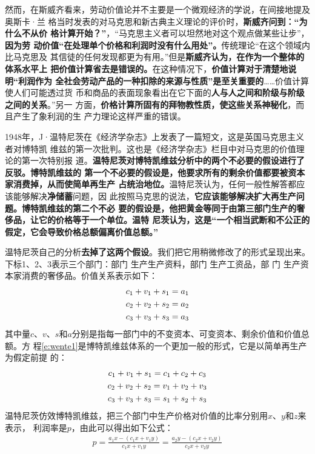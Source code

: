 然而，在斯威齐看来，劳动价值论并不主要是一个微观经济的学说，在间接地提及奥斯卡·兰
格当时发表的对马克思和新古典主义理论的评价时，\textbf{斯威齐问到：“为什么不从价
  格计算开始？”}，“马克思主义者可以坦然地对这个观点做某些让步”，\textbf{因为劳
  动价值“在处理单个价格和利润时没有什么用处”。}传统理论“在这个领域内比马克思及
其信徒的任何发现都更为有用。”但是\textbf{斯威齐认为，在作为一个整体的体系水平上
  把价值计算省去是错误的。}在这种情况下，\textbf{价值计算对于清楚地说明“利润作为
  全社会劳动产品的一种扣除的来源与性质”是至关重要的}……价值计算使人们可能透过货
币和商品的表面现象看出在它下面的\textbf{人与人之间和阶级与阶级之间的关系}。”另一
方面，\textbf{价格计算所固有的拜物教性质，使这些关系神秘化}，而且产生了象利润的生
产力理论这样严重的错误。

1948年，J·温特尼茨在《经济学杂志》上发表了一篇短文，这是英国马克思主义者对博特凯
维兹的第一次批判。这也是《经济学杂志》栏目中对马克思的价值理论的第一次特别报
道。\textbf{温特尼茨对博特凯维兹分析中的两个不必要的假设进行了反驳。博特凯维兹的
  第一个不必要的假设是，他要求所有的剩余价值都要被资本家消费掉，从而使简单再生产
  占统治地位。}温特尼茨认为，任何一般性解答都应该能够解决\textbf{净储蓄}问题，因
此按照马克思的说法，\textbf{它应该能够解决扩大再生产问题。博特凯维兹的第二个不必
  要的假设是，他把黄金等同于由第三部门生产的奢侈品，让它的价格等于一个单位。温特
  尼茨认为，这是“一个相当武断和不公正的假定，它会导致价格总额偏离价值总额。”}

温特尼茨自己的分析\textbf{去掉了这两个假设}。我们把它用稍微修改了的形式呈现出来。
下标1、2、3表示三个部门：部门 生产生产资料，部门 生产工资品，部
门 生产资本家消费的奢侈品。价值关系表示如下：
\begin{gather}
  c_1+v_1+s_1=a_1  \label{e:wente1}\\
  c_2+v_2+s_2=a_2 \notag  \\
  c_3+v_3+s_3=a_3  \notag
\end{gather}
其中量$c、v、s和a$分别是指每一部门中的不变资本、可变资本、剩余价值和价值总额。方
程\eqref{e:wente1}是博特凯维兹体系的一个更加一般的形式，它是以简单再生产为假定前提
的：
\begin{gather}
  c_1+v_1+s_1=c_1+c_2+c_3  \label{e:wente2} \\
  c_2+v_2+s_2=v_1+v_2+v_3 \notag \\
  c_3+v_3+s_3=s_1+s_2+s_3  \notag
\end{gather}
温特尼茨仿效博特凯维兹，把三个部门中生产价格对价值的比率分别用$x$、$y$和$z$来表示，
利润率是$p$，由此可以得出如下公式：
\begin{gather}
  p = \frac{a_1x - (c_1x+v_1y)}{c_1x + v_1y} = \frac{a_2y-(c_2x+v_2y)}{c_2x +
    v_2y} \label{e:wente3}
\end{gather}

